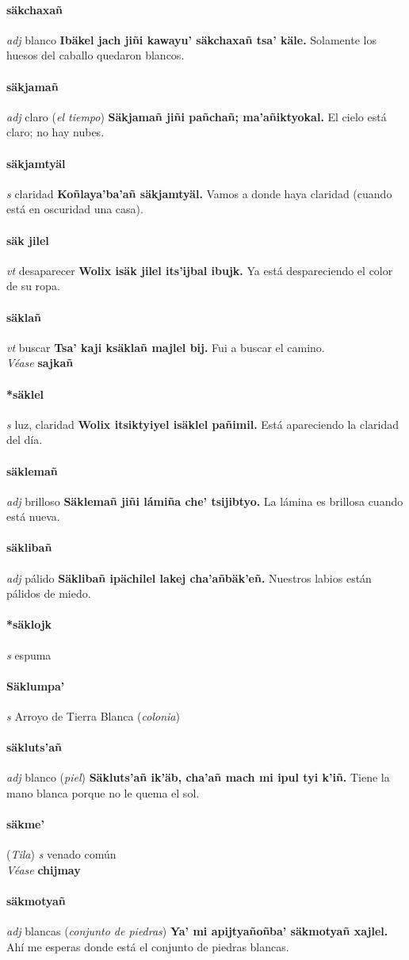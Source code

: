 \documentclass{scrbook}
\newcommand{\entry}[1]{\paragraph{#1}}
\newcommand{\partofspeech}[1]{\textit{#1}}
\newcommand{\spanishtranslation}[1]{#1}
\newcommand{\clarification}[1]{(\textit{#1})}
\newcommand{\cholexample}[1]{\textbf{#1}}
\newcommand{\exampletranslation}[1]{#1}
\newcommand{\alsosee}[1]{\\\textit{Véase} \textbf{#1}}
\newcommand{\relevantdialect}[1]{(\textit{#1})}
\begin{document}
\begin{multicols}{2}
\entry{säkchaxañ}
\partofspeech{adj}
\spanishtranslation{blanco}
\cholexample{Ibäkel jach jiñi kawayu' säkchaxañ tsa' käle.}
\exampletranslation{Solamente los huesos del caballo quedaron blancos.}

\entry{säkjamañ}
\partofspeech{adj}
\spanishtranslation{claro}
\clarification{el tiempo}
\cholexample{Säkjamañ jiñi pañchañ; ma'añiktyokal.}
\exampletranslation{El cielo está claro; no hay nubes.}

\entry{säkjamtyäl}
\partofspeech{s}
\spanishtranslation{claridad}
\cholexample{Koñlaya'ba'añ säkjamtyäl.}
\exampletranslation{Vamos a donde haya claridad (cuando está en oscuridad una casa).}

\entry{säk jilel}
\partofspeech{vt}
\spanishtranslation{desaparecer}
\cholexample{Wolix isäk jilel its'ijbal ibujk.}
\exampletranslation{Ya está despareciendo el color de su ropa.}

\entry{säklañ}
\partofspeech{vt}
\spanishtranslation{buscar}
\cholexample{Tsa' kaji ksäklañ majlel bij.}
\exampletranslation{Fui a buscar el camino.}
\alsosee{sajkañ}

\entry{*säklel}
\partofspeech{s}
\spanishtranslation{luz, claridad}
\cholexample{Wolix itsiktyiyel isäklel pañimil.}
\exampletranslation{Está apareciendo la claridad del día.}

\entry{säklemañ}
\partofspeech{adj}
\spanishtranslation{brilloso}
\cholexample{Säklemañ jiñi lámiña che' tsijibtyo.}
\exampletranslation{La lámina es brillosa cuando está nueva.}

\entry{säklibañ}
\partofspeech{adj}
\spanishtranslation{pálido}
\cholexample{Säklibañ ipächilel lakej cha'añbäk'eñ.}
\exampletranslation{Nuestros labios están pálidos de miedo.}

\entry{*säklojk}
\partofspeech{s}
\spanishtranslation{espuma}

\entry{Säklumpa'}
\partofspeech{s}
\spanishtranslation{Arroyo de Tierra Blanca}
\clarification{colonia}

\entry{säkluts'añ}
\partofspeech{adj}
\spanishtranslation{blanco}
\clarification{piel}
\cholexample{Säkluts'añ ik'äb, cha'añ mach mi ipul tyi k'iñ.}
\exampletranslation{Tiene la mano blanca porque no le quema el sol.}

\entry{säkme'}
\relevantdialect{Tila}
\partofspeech{s}
\spanishtranslation{venado común}
\alsosee{chijmay}

\entry{säkmotyañ}
\partofspeech{adj}
\spanishtranslation{blancas}
\clarification{conjunto de piedras}
\cholexample{Ya' mi apijtyañoñba' säkmotyañ xajlel.}
\exampletranslation{Ahí me esperas donde está el conjunto de piedras blancas.}


\end{multicols}
\end{document}
